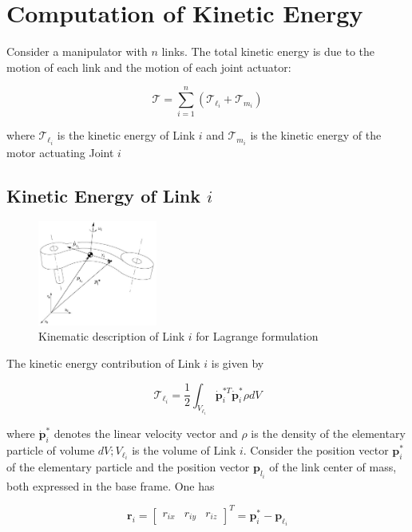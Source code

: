 \documentclass[10pt]{article}
\begin{document}
\section{Computation of Kinetic Energy}
Consider a manipulator with $n$  links. The total kinetic energy is due to the motion of each link and the motion of each joint actuator: 

$$
\mathcal{T}=\sum_{i=1}^{n}\left(\mathcal{T}_{\ell_{i}}+\mathcal{T}_{m_{i}}\right)
$$

where $\mathcal{T}_{\ell_{i}}$ is the kinetic energy of Link $i$ and $\mathcal{T}_{m_{i}}$ is the kinetic energy of the motor actuating Joint $i$

\subsection{Kinetic Energy of Link $i$}


\begin{figure}[H]
    \centering
    \includegraphics[max width=0.35\textwidth]{dynamics/linki_kinematics.jpg}
    \caption{Kinematic description of Link $i$ for Lagrange formulation}
    \label{fig:enter-label}
\end{figure}




The kinetic energy contribution of Link $i$ is given by

\begin{equation}\label{equ.link_ke}
            \mathcal{T}_{\ell_{i}}=\frac{1}{2} \int_{V_{\ell_{i}}} \dot{\boldsymbol{p}}_{i}^{* T} \dot{\boldsymbol{p}}_{i}^{*} \rho d V
\end{equation}

where $\dot{\boldsymbol{p}}_{i}^{*}$ denotes the linear velocity vector and $\rho$ is the density of the elementary particle of volume $d V ; V_{\ell_{i}}$ is the volume of Link $i$. Consider the position vector $\boldsymbol{p}_{i}^{*}$ of the elementary particle and the position vector $\boldsymbol{p}_{l_{i}}$ of the link center of mass, both expressed in the base frame. One has

$$
\boldsymbol{r}_{i}=\left[\begin{array}{lll}
r_{i x} & r_{i y} & r_{i z}
\end{array}\right]^{T}=\boldsymbol{p}_{i}^{*}-\boldsymbol{p}_{\ell_{i}}
$$
\end{document}
